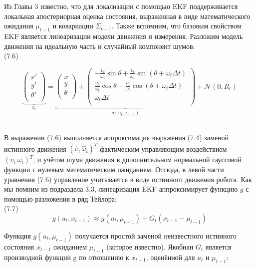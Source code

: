 \documentclass[10pt,a4paper]{article}
\begin{document}
Из Главы 3 известно, что для локализации с помощью EKF поддерживается локальная апостериорная оценка состояния, выраженная в виде математического ожидания $\mu_{t-1}$ и ковариации $\varSigma_{t-1}$. Также вспомним, что базовым свойством EKF является линеаризации модели движения и измерения. Разложим модель движения на идеальную часть и случайный компонент шумов:\\

(7.6)
\begin{minipage}{0.2\textwidth}
	\begin{equation*}
	\underbrace{
	\left(\begin{array}{c}
	x'\\
	y'\\
	\theta'\\
	\end{array}\right)}_{x_t}
	=
	\underbrace{
	\left(\begin{array}{c}
	x\\
	y\\
	\theta\\
	\end{array}\right)
	+
	\left(\begin{array}{c}
	-\frac{\upsilon_t}{\omega_t}\sin\theta+\frac{\upsilon_t}{\omega_t}\sin(\theta+\omega_t\varDelta t)\\
	\frac{\upsilon_t}{\omega_t}\cos\theta-\frac{\upsilon_t}{\omega_t}\cos(\theta+\omega_t\varDelta t)\\
	\omega_t\varDelta t\\
	\end{array}\right)}_{g(u_t,x_{t-1})}
    +\mathcal{N}(0,R_t)
	\end{equation*}
\end{minipage}\\ 

В выражении (7.6) выполняется аппроксимация выражения (7.4) заменой истинного движения
$(\hat{\upsilon}_t\,\hat{\omega}_t)^T$ фактическим управляющим воздействием $(\upsilon_t\,\omega_t)^T$, и учётом шума движения в дополнительном нормальной гауссовой функции с нулевым математическим ожиданием. Отсюда, в левой части уравнения (7.6)  управление учитывается в виде истинного движения робота. Как мы помним из подраздела 3.3, линеаризация EKF аппроксимирует функцию $g$ с помощью разложения в ряд Тейлора:\\

(7.7)
$$g(u_t,x_{t-1})\approx g(u_t,\mu_{t-1})+G_t(x_{t-1}-\mu_{t-1})$$

Функция $g(u_t, \mu_{t-1})$ получается простой заменой неизвестного истинного состояния
$x_{t-1}$ ожиданием $\mu_{t-1}$ (которое известно).
Якобиан $G_t$ является производной функции g по отношению к $x_{t-1}$, оценённой для $u_t$ и $\mu_{t-1}$:
\end{document}
